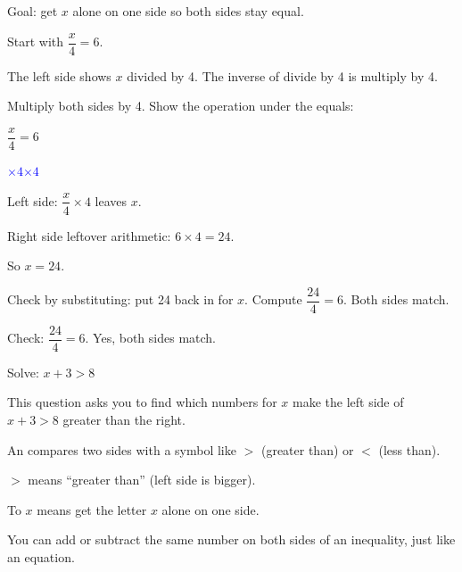 \begin{steps}
  \item Goal: get $x$ alone on one side so both sides stay equal.
  \item Start with $\dfrac{x}{4} = 6$.
  \item The left side shows $x$ divided by 4. The inverse of divide by 4 is
        multiply by 4.
  \item Multiply both sides by 4. Show the operation under the equals:
        \begin{center}
          $\dfrac{x}{4} = 6$\par\smallskip
          \underline{\hspace{0.6em}\textcolor{blue}{$\times 4$}\hspace{1.6em}\textcolor{blue}{$\times 4$}\hspace{0.6em}}
        \end{center}
  \item Left side: $\dfrac{x}{4} \times 4$ leaves $x$.
  \item Right side leftover arithmetic: $6 \times 4 = 24$.
  \item So $x = 24$.
  \item Check by substituting: put 24 back in for $x$. Compute
        $\dfrac{24}{4} = 6$. Both sides match.
\end{steps}


Check: $\dfrac{24}{4} = 6$. Yes, both sides match.


Solve: $x + 3 > 8$\ \blank[2.4cm]


This question asks you to find which numbers for $x$ make the left side of
$x + 3 > 8$ greater than the right.

\begin{words}
  \item An compares two sides with a symbol like $>$ (greater
        than) or $<$ (less than).
  \item $>$ means ``greater than'' (left side is bigger).
  \item To $x$ means get the letter $x$ alone on one side.
  \item You can add or subtract the same number on both sides of an inequality,
        just like an equation.
\end{words}

